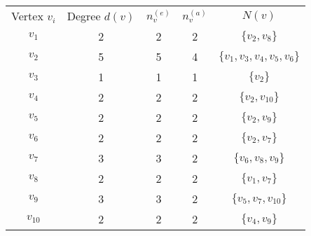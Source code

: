 \begin{table}[ht]
\centering
    \begin{tabular}{c c c c c}
		Vertex $v_{i}$ & Degree $d(v)$ & $n_v^{(e)}$& $n_v^{(a)}$ & $N(v)$\\
		$v_{1}$ & 2 & 2 & 2 & $\{v_2,v_8\}$ \\
		\rowcolor{Orange}
		$v_{2}$ & 5 & 5 & 4 & $\{v_1,v_3,v_4,v_5,v_6\}$\\
		$v_{3}$ & 1 & 1 & 1 & $\{v_2\}$\\
		$v_{4}$ & 2 & 2 & 2 & $\{v_2,v_{10}\}$\\
		$v_{5}$ & 2 & 2 & 2 & $\{v_2,v_9\}$\\
		$v_{6}$ & 2 & 2 & 2 & $\{v_2,v_7\}$\\
		$v_{7}$ & 3 & 3 & 2 & $\{v_6,v_8,v_9\}$\\
		$v_{8}$ & 2 & 2 & 2 & $\{v_1,v_7\}$\\
		$v_{9}$ & 3 & 3 & 2 & $\{v_5,v_7,v_{10}\}$\\
		$v_{10}$ & 2 & 2 & 2 & $\{v_4,v_9\}$\\
	\end{tabular}
	\label{viradstable}
\end{table}
\newpage
